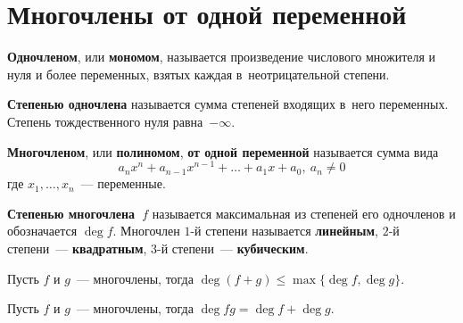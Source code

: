\section{Многочлены от одной переменной}
  \textbf{Одночленом}, или \textbf{мономом}, называется произведение числового множителя и нуля и более переменных, взятых каждая в~неотрицательной степени.

\textbf{Степенью одночлена} называется сумма степеней входящих в~него переменных.
Степень тождественного нуля равна~$-\infty$.

  \textbf{Многочленом}, или \textbf{полиномом}, \textbf{от одной переменной} называется сумма вида
\begin{equation*}
a_n x^n + a_{n-1} x^{n-1} + \ldots + a_1 x + a_0, \ a_n \neq 0
\end{equation*}
где $x_1, \ldots, x_n$~--- переменные.

 \textbf{Степенью многочлена~$f$} называется максимальная из степеней его одночленов и обозначается $\deg f$.
Многочлен $1$-й степени называется \textbf{линейным}, $2$-й степени~--- \textbf{квадратным}, $3$-й степени~--- \textbf{кубическим}.

\begin{statement}
Пусть $f$ и $g$~--- многочлены, тогда $\deg (f + g) \leqslant \max \{ \deg f, \deg g \}$.
\end{statement}
\begin{statement}
Пусть $f$ и $g$~--- многочлены, тогда $\deg fg = \deg f + \deg g$.
\end{statement}

